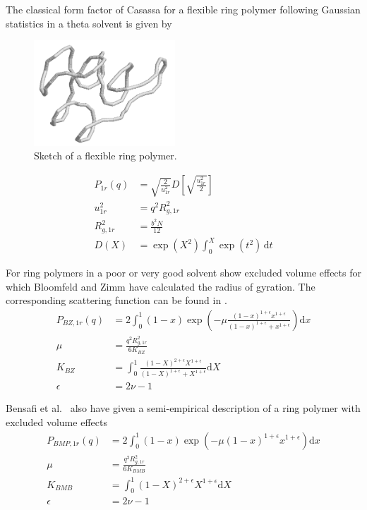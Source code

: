The classical form factor of Casassa for a flexible ring polymer following Gaussian statistics in a theta solvent is given by
\begin{figure}[htb]
\begin{center}
\includegraphics[width=0.471\textwidth,height=0.353\textwidth]{flexibleRing.png}
\end{center}
\caption{Sketch of a flexible ring polymer.}
\label{fig:flexibleRing}
\end{figure}

\begin{align}\label{eq:rinpolymerCasassa}
P_{1r}(q) & = \sqrt{\frac{2}{u_{1r}^2}} D\left[ \sqrt{\frac{u_{1r}^2}{2}} \right] \\
u_{1r}^2 &= q^2R^2_{g,1r} \\
R^2_{g,1r} &= \frac{b^2N}{12} \\
D(X) &= \exp\left(X^2\right) \int_0^X \exp(t^2)\, \mathrm{d}t
\end{align}

For ring polymers in a poor or very good solvent show excluded volume effects for which Bloomfeld and Zimm \cite{Bloomfield1966,Bensafi2000,Goosen2015} have calculated the radius of gyration. The corresponding scattering function can be found in \cite{Bensafi2000}.
\begin{align}\label{eq:rinpolymerBZ}
  P_{BZ,1r}(q) &= 2   \int_{0}^{1}(1-x)\exp\left(-\mu\frac{(1-x)^{1+\epsilon}x^{1+\epsilon}}{(1-x)^{1+\epsilon}+x^{1+\epsilon}}\right)\mathrm{d}x \\
  \mu &= \frac{q^2 R^2_{g,1r}}{6 K_{BZ}} \\
  K_{BZ} &= \int_0^1 \frac{(1-X)^{2+\epsilon}X^{1+\epsilon}}{(1-X)^{1+\epsilon}+X^{1+\epsilon}}\mathrm{d}X \\
  \epsilon &= 2\nu-1
\end{align}


Bensafi et al.\  \cite{Bensafi2000} also have given a semi-empirical description of a ring polymer with excluded volume effects
\begin{align}\label{eq:rinpolymerBMB}
  P_{BMP,1r}(q) &= 2 \int_{0}^{1}(1-x)\exp\left(-\mu (1-x)^{1+\epsilon}x^{1+\epsilon}\right)\mathrm{d}x \\
  \mu &= \frac{q^2 R^2_{g,1r}}{6 K_{BMB}} \\
  K_{BMB} &= \int_0^1 (1-X)^{2+\epsilon}X^{1+\epsilon} \mathrm{d}X \\
  \epsilon &= 2\nu-1
\end{align}

